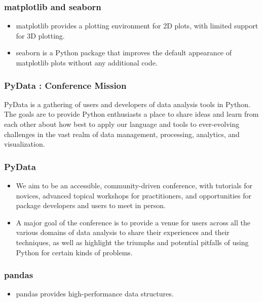 \documentclass[MASTER.tex]{subfiles}
\begin{document}
\begin{frame}
\frametitle{matplotlib and seaborn}
\large
\begin{itemize}
\item matplotlib provides a plotting environment for 2D plots, with limited support for 3D plotting. 
\item seaborn is
a Python package that improves the default appearance of matplotlib plots without any additional code.
\end{itemize}

\end{frame}
\begin{frame}
	\frametitle{PyData :  Conference Mission}
\large
	

PyData is a gathering of users and developers of data analysis tools in Python. The goals are to provide Python enthusiasts a place to share ideas and learn from each other about how best to apply our language and tools to ever-evolving challenges in the vast realm of data management, processing, analytics, and visualization.

\end{frame}
\begin{frame}
\large
\frametitle{PyData}
\begin{itemize}
\item We aim to be an accessible, community-driven conference, with tutorials for novices, advanced topical workshops for practitioners, and opportunities for package developers and users to meet in person.

\item A major goal of the conference is to provide a venue for users across all the various domains of data analysis to share their experiences and their techniques, as well as highlight the triumphs and potential pitfalls of using Python for certain kinds of problems.
\end{itemize}
\end{frame}
\begin{frame}
\frametitle{pandas}
\begin{itemize}
\item pandas provides high-performance data structures.
\end{itemize}
\end{frame}
\end{document}
